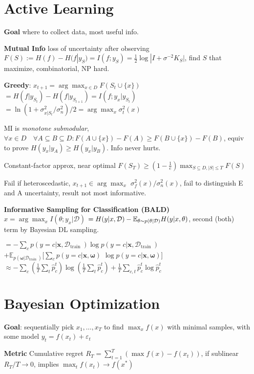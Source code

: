 \section{Active Learning}
\textbf{Goal} where to collect data, most useful info.

\textbf{Mutual Info} loss of uncertainty after observing $F(S):=H(f)-H(f | y_S)=I(f ; y_S)=\frac{1}{2} \log |I+\sigma^{-2} K_S|$, find $S$ that maximize, combinatorial, NP hard.

\textbf{Greedy}: $x_{t+1}=\arg \max _{x \in D} F(S_t \cup\{x\})$ $=H(f|y_{S_{t}}) - H(f|y_{S_{t+1}}) = I(f;y_{x} | y_{S_{t}})$ $=\ln(1+\sigma_{x|S_{t}}^2/\sigma_n^2)/2 =\arg \max _x \sigma_t^2(x)$
   
MI is \textit{monotone submodular}, $\forall x \in D \quad \forall A \subseteq B \subseteq D: F(A \cup\{x\})-F(A) \geq F(B \cup\{x\})-F(B)$, equiv to prove $H(y_x|y_A) \geq H(y_x|y_B)$. Info never hurts.

Constant-factor approx, near optimal $F(S_T) \geq(1-\frac{1}{e}) \max _{S \subseteq D,|S| \leq T} F(S)$

Fail if heteroscedastic, $x_{t+1} \in \arg \max _x$ $\sigma_f^2(x) /\sigma_n^2(x)$, fail to distinguish E and A uncertainty, result not most informative.

\textbf{Informative Sampling for Classification (BALD)} $x=\arg\max_x I(\theta; y_x | \mathcal{D})$ $=H(y|x, \mathcal{D}) - \mathbb{E}_{\theta{\small \sim} p(\theta|\mathcal{D})}H(y|x, \theta)$, second (both) term by Bayesian DL sampling. 

 $=-\sum_c p(y=c | \mathbf{x}, \mathcal{D}_{\text {train }}) \log p(y=c | \mathbf{x}, \mathcal{D}_{\text {train }}) $ $+ \mathbb{E}_{p(\boldsymbol{\omega} | \mathcal{D}_{\text {train }})}[\sum_c p(y=c | \mathbf{x}, \boldsymbol{\omega})$ $ \log p(y=c | \mathbf{x}, \boldsymbol{\omega})] $
$\approx-\sum_c(\frac{1}{T} \sum_t \hat{p}_c^t) \log (\frac{1}{T} \sum_t \widehat{p}_c^t)+\frac{1}{T} \sum_{c, t} \widehat{p}_c^t \log \widehat{p}_c^t$

\section{Bayesian Optimization}
\textbf{Goal}: sequentially pick $x_1,\ldots, x_T$ to find $\max_x f(x)$ with minimal samples, with some model $y_t=f(x_t)+\varepsilon_t$

\textbf{Metric} Cumulative regret $R_T=\sum_{t=1}^T(\max f(x)-f(x_t))$, if sublinear $R_T / T \to 0$, implies $\max _t f(x_t) \to f(x^*)$


